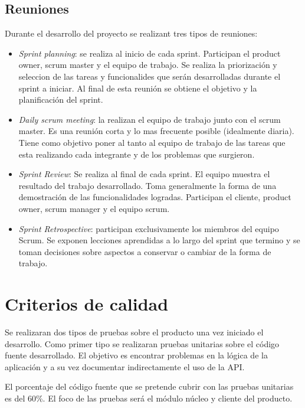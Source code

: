 \documentclass[12pt,a4paper]{article}
\begin{document}
	\subsection{Reuniones}
	Durante el desarrollo del proyecto se realizant tres tipos de reuniones:

	\begin{itemize}
	\item \textit{Sprint planning}: se realiza al inicio de cada sprint. Participan el product owner, scrum master y el equipo de trabajo. Se realiza la priorización y seleccion de las tareas y funcionalides que serán desarrolladas durante el sprint a iniciar. Al final de esta reunión se obtiene el objetivo y la planificación del sprint.

	\item \textit{Daily scrum meeting}: la realizan el equipo de trabajo junto con el scrum master. Es una reunión corta y lo mas frecuente posible (idealmente diaria).  Tiene como objetivo poner al tanto al equipo de trabajo de las tareas que esta realizando cada integrante y de los problemas que surgieron.

	\item \textit{Sprint Review}: Se realiza al final de cada sprint. El equipo muestra el resultado del trabajo desarrollado. Toma generalmente la forma de una demostración de las funcionalidades logradas. Participan el cliente, product owner, scrum manager y el equipo scrum.

	\item \textit{Sprint Retrospective}: participan exclusivamente los miembros del equipo Scrum. Se exponen lecciones aprendidas a lo largo del sprint que termino y se toman decisiones sobre aspectos a conservar o cambiar de la forma de trabajo.
	\end{itemize}
	\section{Criterios de calidad}
	
Se realizaran dos tipos de pruebas sobre el producto una vez iniciado el desarrollo. Como primer tipo se realizaran pruebas unitarias sobre el código fuente desarrollado. El objetivo es encontrar problemas en la lógica de la aplicación y a su vez documentar indirectamente el uso de la API.

El porcentaje del código fuente que se pretende cubrir con las pruebas unitarias es del 60\%. El foco de las pruebas será el módulo núcleo y cliente del producto.
\end{document}
